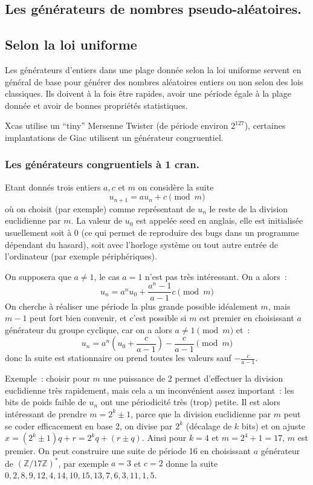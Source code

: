 \documentclass[a4paper,11pt]{book}
\begin{document}
\begin{giacjshere}
\pagebreak

\chapter{Les générateurs de nombres pseudo-aléatoires.}
\label{sec:random}
\section{Selon la loi uniforme}
Les générateurs d'entiers dans une plage donnée selon la loi
uniforme servent en général de base pour générer des 
nombres aléatoires entiers ou non selon des lois classiques.
Ils doivent à la fois être rapides, avoir une période égale à
la plage donnée et avoir de bonnes propriétés statistiques.

Xcas utilise un ``tiny'' Mersenne Twister (de période environ $2^{127}$),
certaines implantations de Giac utilisent un générateur congruentiel.

\subsection{Les générateurs congruentiels \`a 1 cran.}
Etant donnés trois entiers $a, c$ et $m$ on considère la suite
$$ u_{n+1}=au_n+c \pmod m $$
où on choisit (par exemple) comme représentant de $u_n$
le reste de la division euclidienne par $m$. La valeur de $u_0$
est appelée seed en anglais, elle est initialisée usuellement
soit à 0 (ce qui permet de reproduire des bugs dans un programme
dépendant du hasard), soit avec l'horloge système ou tout autre
entrée de l'ordinateur (par exemple périphériques).

On supposera que $a\neq 1$, le cas $a=1$ n'est pas tr\`es
int\'eressant. On a alors~:
$$ u_n=a^n u_0 + \frac{a^n-1}{a-1} c \pmod m$$
On cherche \`a r\'ealiser une p\'eriode la plus grande possible
id\'ealement $m$, mais $m-1$ peut fort bien convenir, et c'est
possible si $m$ est premier en choisissant 
$a$ g\'en\'erateur du groupe cyclique, car on a alors $a\neq 1 \pmod m$ et~:
$$ u_n=a^n (u_0 + \frac{c}{a-1}) - \frac{c}{a-1}  \pmod m$$
donc la suite est stationnaire ou prend toutes les valeurs sauf $- \frac{c}{a-1} $.

Exemple~: choisir pour $m$ une puissance de 2 permet d'effectuer
la division euclidienne tr\`es rapidement, mais cela a un
inconv\'enient assez important~: les bits de poids faible
de $u_n$ ont une p\'eriodicit\'e tr\`es (trop) petite.
Il est alors int\'eressant de prendre $m=2^k \pm 1$, parce
que la division euclidienne par $m$ peut se coder efficacement en base
2, on divise par $2^k$ (d\'ecalage de $k$ bits) et on ajuste
$x=(2^k \pm 1)q+r=2^k q + (r \pm q)$.
Ainsi pour $k=4$ et $m=2^4+1=17$, $m$ est premier.
On peut construire une suite de p\'eriode 16 en choisissant $a$ g\'en\'erateur
de $(\mathbb{Z}/17\mathbb{Z})^*$, par exemple $a=3$ et $c=2$ donne la suite
$0,2,8,9,12,4,14,10,15,13,7,6,3,11,1,5$.


\end{giacjshere}
\end{document}
